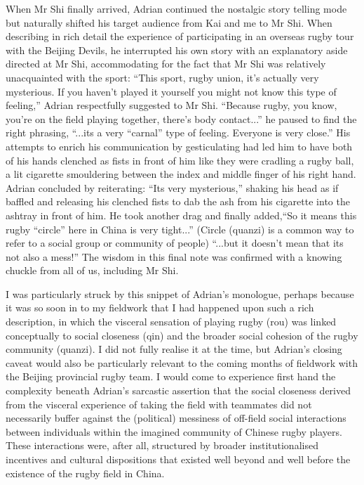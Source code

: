 When Mr Shi finally arrived, Adrian continued the nostalgic story telling mode but naturally shifted his target audience from Kai and me to Mr Shi.  When describing in rich detail the experience of participating in an overseas rugby tour with the Beijing Devils, he interrupted his own story with an explanatory aside directed at Mr Shi, accommodating for the fact that Mr Shi was relatively unacquainted with the sport: ``This sport, rugby union, it's actually very mysterious. If you haven't played it yourself you might not know this type of feeling,'' Adrian respectfully suggested to Mr Shi. ``Because rugby, you know, you're on the field playing together, there's body contact...'' he paused to find the right phrasing,  ``...its a very ``carnal'' type of feeling. Everyone is very close.'' His attempts to enrich his communication by gesticulating had led him to have both of his hands clenched as fists in front of him like they were cradling a rugby ball, a lit cigarette smouldering between the index and middle finger of his right hand.  Adrian concluded by reiterating: ``Its very mysterious,'' shaking his head as if baffled and releasing his clenched fists to dab the ash from his cigarette into the ashtray in front of him. He took another drag and  finally added,``So it means this rugby ``circle'' here in China is very tight...'' (Circle (quanzi) is a common way to refer to a social group or community of people) ``...but it doesn't mean that its not also a mess!'' The wisdom in this final note was confirmed with a knowing chuckle from all of us, including Mr Shi.


I was particularly struck by this snippet of Adrian's monologue, perhaps because it was so soon in to my fieldwork that I had happened upon such a rich description, in which the visceral sensation of playing rugby (rou) was linked conceptually to social closeness (qin) and the broader social cohesion of the rugby community (quanzi).  I did not fully realise it at the time, but Adrian's closing caveat would also be particularly relevant to the coming months of fieldwork with the Beijing provincial rugby team. I would come to experience first hand the complexity beneath Adrian's sarcastic assertion that the social closeness derived from the visceral experience of taking the field with teammates did not necessarily buffer against the (political) messiness of off-field social interactions between individuals within the imagined community of Chinese rugby players.  These interactions were, after all, structured by broader institutionalised incentives and cultural dispositions that existed well beyond and well before the existence of the rugby field in China.

